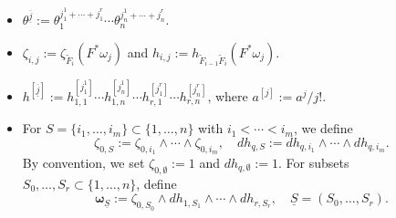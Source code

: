 \documentclass[12pt, a4paper]{article}
\begin{document}
\begin{itemize}
\item $\theta^{\underline{\overline j}}:=\theta_1^{j_1^1+\cdots+j^r_1}\cdots\theta_n^{j^1_n+\cdots+j^r_n}$. 
    \item $\zeta_{i,j}:=\zeta_{\tilde F_i}(F^*\omega_j)$ and $h_{i,j}:=h_{\tilde F_{i-1}\tilde F_i}(F^*\omega_j)$.
    \item $h^{[\underline{\overline j}]}:=h^{[j^1_1]}_{1,1}\cdots h^{[j^1_n]}_{1,n}\cdots h^{[j^r_1]}_{r,1}\cdots h^{[j^r_n]}_{r,n}$, where $a^{[j]}:=a^j/j!$.
    \item For \( S = \{i_1, \dots, i_m\} \subset \{1, \dots, n\} \) with \( i_1 < \cdots < i_m \), we define  
\[
\zeta_{0,S} := \zeta_{0,i_1} \wedge \cdots \wedge \zeta_{0,i_m}, \quad dh_{q,S} := dh_{q,i_1} \wedge \cdots \wedge dh_{q,i_m}.
\]  
By convention, we set \( \zeta_{0,\emptyset} := 1 \) and \( dh_{q,\emptyset} := 1 \). For subsets \( S_0, \dots, S_r \subset \{1, \dots, n\} \), define  
\[
\boldsymbol{\omega}_{\underline{S}} := \zeta_{0,S_0} \wedge dh_{1,S_1} \wedge \cdots \wedge dh_{r,S_r}, \quad \underline{S} = (S_0, \dots, S_r).
\]
\end{itemize}
\end{document}
